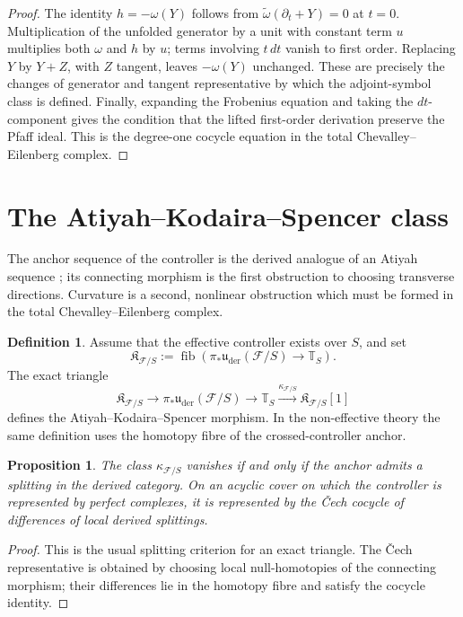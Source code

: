 \documentclass[11pt,reqno,a4paper,dvipsnames,x11names]{amsart}
\numberwithin{equation}{section}
\theoremstyle{plain}
\newtheorem{proposition}[theorem]{Proposition}
\theoremstyle{definition}
\newtheorem{definition}[theorem]{Definition}
\theoremstyle{remark}
\DeclareMathOperator{\fib}{fib}
\newcommand{\cF}{\mathcal F}
\newcommand{\uuder}{\mathfrak u_{\mathrm{der}}}
\newcommand{\bbT}{\mathbb T}
\newcommand{\xto}[1]{\xrightarrow{#1}}
\begin{document}
\begin{proof}
The identity \(h=-\omega(Y)\) follows from
\(\widetilde\omega(\partial_t+Y)=0\) at \(t=0\). Multiplication of the unfolded generator by a unit with constant term \(u\) multiplies both \(\omega\) and \(h\) by \(u\); terms involving \(t\,dt\) vanish to first order. Replacing \(Y\) by \(Y+Z\), with \(Z\) tangent, leaves \(-\omega(Y)\) unchanged. These are precisely the changes of generator and tangent representative by which the adjoint-symbol class is defined. Finally, expanding the Frobenius equation and taking the \(dt\)-component gives the condition that the lifted first-order derivation preserve the Pfaff ideal. This is the degree-one cocycle equation in the total Chevalley--Eilenberg complex.
\end{proof}


\section{The Atiyah--Kodaira--Spencer class}\label{sec:AKS}

The anchor sequence of the controller is the derived analogue of an Atiyah sequence \cite{Atiyah57}; its connecting morphism is the first obstruction to choosing transverse directions. Curvature is a second, nonlinear obstruction which must be formed in the total Chevalley--Eilenberg complex.

\begin{definition}
Assume that the effective controller exists over \(S\), and set
\[
 \mathfrak K_{\cF/S}
 :=\fib\left(
 \pi_*\uuder(\cF/S)\longrightarrow\bbT_S
 \right).
\]
The exact triangle
\[
 \mathfrak K_{\cF/S}\longrightarrow
 \pi_*\uuder(\cF/S)\longrightarrow
 \bbT_S\xto{\kappa_{\cF/S}}
 \mathfrak K_{\cF/S}[1]
\]
defines the Atiyah--Kodaira--Spencer morphism. In the non-effective theory the same definition uses the homotopy fibre of the crossed-controller anchor.
\end{definition}

\begin{proposition}\label{prop:AKS-splitting}
The class \(\kappa_{\cF/S}\) vanishes if and only if the anchor admits a splitting in the derived category. On an acyclic cover on which the controller is represented by perfect complexes, it is represented by the \v{C}ech cocycle of differences of local derived splittings.
\end{proposition}

\begin{proof}
This is the usual splitting criterion for an exact triangle. The \v{C}ech representative is obtained by choosing local null-homotopies of the connecting morphism; their differences lie in the homotopy fibre and satisfy the cocycle identity.
\end{proof}
\end{document}
